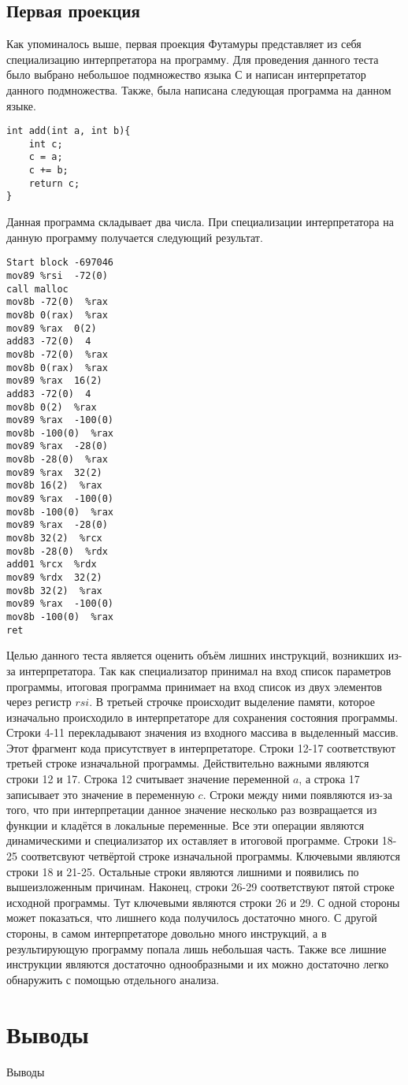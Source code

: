 \documentclass{spbau-diploma}
\begin{document}
\subsection{ Первая проекция}
Как упоминалось выше, первая проекция Футамуры представляет из себя специализацию интерпретатора на программу. Для проведения данного теста было выбрано небольшое подмножество языка С и написан интерпретатор данного подмножества. Также, была написана следующая программа на данном языке.
\begin{lstlisting}
int add(int a, int b){
    int c;
    c = a;
    c += b;
    return c;
}
\end{lstlisting}
Данная программа складывает два числа. При специализации интерпретатора на данную программу получается следующий результат.
\begin{lstlisting}
Start block -697046
mov89 %rsi  -72(0) 
call malloc
mov8b -72(0)  %rax
mov8b 0(rax)  %rax
mov89 %rax  0(2)
add83 -72(0)  4
mov8b -72(0)  %rax
mov8b 0(rax)  %rax
mov89 %rax  16(2)
add83 -72(0)  4
mov8b 0(2)  %rax 
mov89 %rax  -100(0) 
mov8b -100(0)  %rax 
mov89 %rax  -28(0) 
mov8b -28(0)  %rax 
mov89 %rax  32(2)
mov8b 16(2)  %rax 
mov89 %rax  -100(0) 
mov8b -100(0)  %rax 
mov89 %rax  -28(0) 
mov8b 32(2)  %rcx 
mov8b -28(0)  %rdx 
add01 %rcx  %rdx 
mov89 %rdx  32(2) 
mov8b 32(2)  %rax 
mov89 %rax  -100(0) 
mov8b -100(0)  %rax 
ret
\end{lstlisting}

Целью данного теста является оценить объём лишних инструкций, возникших из-за интерпретатора. Так как специализатор принимал на вход список параметров программы, итоговая программа принимает на вход список из двух элементов через регистр $rsi$. В третьей строчке происходит выделение памяти, которое изначально происходило в интерпретаторе для сохранения состояния программы. Строки 4-11 перекладывают значения из входного массива в выделенный массив. Этот фрагмент кода присутствует в интерпретаторе. Строки 12-17 соответствуют третьей строке изначальной программы. Действительно важными являются строки 12 и 17. Строка 12 считывает значение переменной $a$, а строка 17 записывает это значение в переменную $c$. Строки между ними появляются из-за того, что при интерпретации данное значение несколько раз возвращается из функции и кладётся в локальные переменные. Все эти операции являются динамическими и специализатор их оставляет в итоговой программе. Строки 18-25 соответсвуют четвёртой строке изначальной программы. Ключевыми являются строки 18 и 21-25. Остальные строки являются лишними и появились по вышеизложенным причинам. Наконец, строки 26-29 соответствуют пятой строке исходной программы. Тут ключевыми являются строки 26 и 29. С одной стороны может показаться, что лишнего кода получилось достаточно много. С другой стороны, в самом интерпретаторе довольно много инструкций, а в результирующую программу попала лишь небольшая часть. Также все лишние инструкции являются достаточно однообразными и их можно достаточно легко обнаружить с помощью отдельного анализа.  

\section*{Выводы}

Выводы



\end{document}
